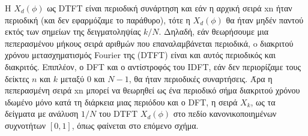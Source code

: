 \documentclass[letterpaper,10pt,english]{sphinxmanual}
\begin{document}
\sphinxAtStartPar
Η \(X_d(\phi)\) ως DTFT είναι περιοδική συνάρτηση και εάν η αρχική σειρά xn ήταν περιοδική (και δεν
εφαρμόζαμε το παράθυρο), τότε η \(X_d(\phi)\) θα ήταν μηδέν παντού εκτός των σημείων της
δειγματοληψίας \(k/Ν\). Δηλαδή, εάν θεωρήσουμε μια πεπερασμένου μήκους σειρά αριθμών που
επαναλαμβάνεται περιοδικά, o διακριτού χρόνου μετασχηματισμός Fourier της (DTFT) είναι και
αυτός περιοδικός και διακριτός. Επιπλέον, ο DFT και ο αντίστροφός του IDFT, εάν δεν
περιορίζαμε τους δείκτες \(n\) και \(k\) μεταξύ \(0\) και \(N-1\), θα ήταν περιοδικές συναρτήσεις. Άρα η
πεπερασμένη σειρά xn μπορεί να θεωρηθεί ως ένα περιοδικό σήμα διακριτού χρόνου ιδωμένο μόνο
κατά τη διάρκεια μιας περιόδου και ο DFT, η σειρά \(X_k\), ως τα δείγματα με ανάλυση \(1/Ν\) του DTFT
\(X_d(\phi)\) στο πεδίο κανονικοποιημένων συχνοτήτων \([0,1]\), όπως φαίνεται στο επόμενο σχήμα.

\sphinxAtStartPar
{}
\end{document}
